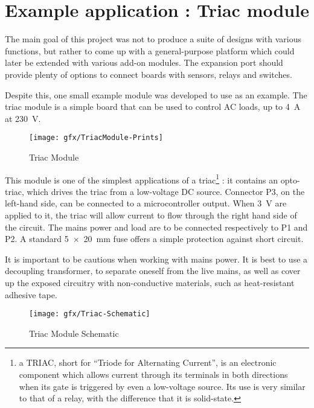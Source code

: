 \section{Example application : Triac module}

The main goal of this project was not to produce a suite of designs with various
functions, but rather to come up with a general-purpose platform which could
later be extended with various add-on modules. The expansion port should provide
plenty of options to connect boards with sensors, relays and switches.

Despite this, one small example module was developed to use as an example. The
triac module is a simple board that can be used to control AC loads, up to
\SI{4}{A} at \SI{230}{V}.

\begin{figure}[htb]
  \begin{center}
    \texttt{[image: gfx/TriacModule-Prints]}
  \end{center}
  \caption{Triac Module}
  \label{fig:triac-module}
\end{figure}

This module is one of the simplest applications of a triac\footnote{a TRIAC,
short for ``Triode for Alternating Current'', is an electronic component which
allows current through its terminals in both directions when its gate is
triggered by even a low-voltage source. Its use is very similar to that of
a relay, with the difference that it is solid-state.}
: it contains an opto-triac, which drives the triac from a low-voltage DC
source. Connector P3, on the left-hand side, can be connected to
a microcontroller output. When \SI{3}{V} are applied to it, the triac will allow
current to flow through the right hand side of the circuit. The mains power and
load are to be connected respectively to P1 and P2. A standard \SI{5x20}{mm}
fuse offers a simple protection against short circuit.

It is important to be cautious when working with mains power. It is best to use
a decoupling transformer, to separate oneself from the live mains, as well as
cover up the exposed circuitry with non-conductive materials, such as
heat-resistant adhesive tape.

\begin{figure}[htb]
  \begin{center}
    \texttt{[image: gfx/Triac-Schematic]}
  \end{center}
  \caption{Triac Module Schematic}
  \label{fig:triac-schematic}
\end{figure}

